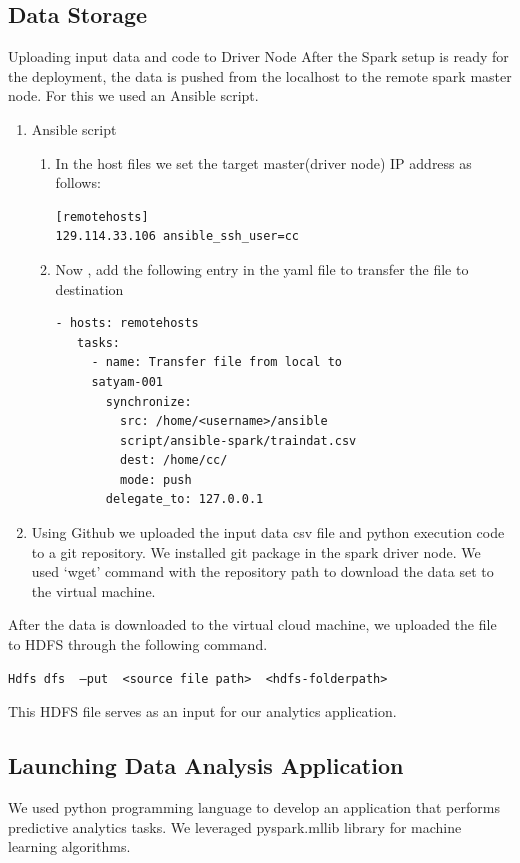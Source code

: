 \documentclass[9pt,twocolumn,twoside]{styles/osajnl}
\begin{document}
\subsection{Data Storage}
 Uploading input data and code to Driver Node After the Spark setup is ready for the deployment, the data is pushed from the localhost to the remote spark master node. For this we used an Ansible script.
\begin{enumerate}
 \item Ansible script
\begin{enumerate}
 \item In the host files we set the target master(driver node) IP address as follows:
 \begin{verbatim}
[remotehosts]
129.114.33.106 ansible_ssh_user=cc
\end{verbatim}
\item  Now , add the following entry in the yaml file to transfer the file to destination
\begin{verbatim}
- hosts: remotehosts
   tasks:
     - name: Transfer file from local to
     satyam-001
       synchronize:
         src: /home/<username>/ansible
         script/ansible-spark/traindat.csv
         dest: /home/cc/
         mode: push
       delegate_to: 127.0.0.1
\end{verbatim}
\end{enumerate}
\item Using Github we uploaded the input data csv file and python execution code to a git repository. We installed git package in the spark driver node. We used ‘wget’ command  with the repository path to download  the data set to the virtual machine.
\end{enumerate}

 
After the data is downloaded to the virtual cloud machine, we uploaded the file to HDFS through the following command.
\begin{verbatim}
Hdfs dfs  –put  <source file path>  <hdfs-folderpath>
\end{verbatim}

This HDFS file serves as an input for our analytics application.

\subsection{Launching Data Analysis Application}
 We used  python programming language to develop an application that  performs predictive analytics tasks. We leveraged  pyspark.mllib library for machine learning algorithms.
 
\end{document}
